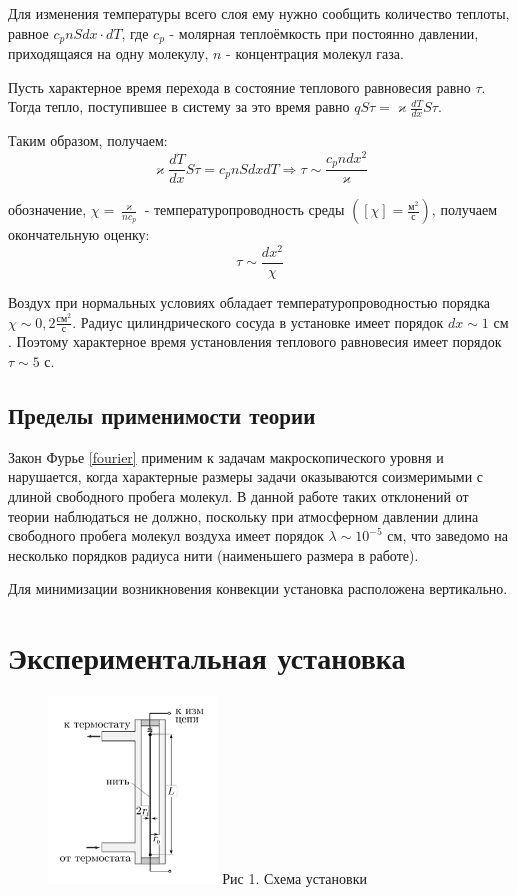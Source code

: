 \documentclass[15pt,a5paper,reqno]{article}
\renewcommand{\kappa}{\varkappa}
\begin{document}
    Для изменения температуры всего слоя ему нужно сообщить количество теплоты, равное $c_p nSdx\cdot dT$, где $c_p$ - молярная теплоёмкость при постоянно давлении, приходящаяся на одну молекулу, $n$ - концентрация молекул газа.
    
    Пусть характерное время перехода в состояние теплового равновесия равно $\tau$. Тогда тепло, поступившее в систему за это время равно $qS\tau = \kappa\frac{dT}{dx}S\tau$.
    
    Таким образом, получаем:
    \[\kappa\frac{dT}{dx}S\tau = c_pnSdxdT \Rightarrow \tau \sim \frac{c_p n dx^2}{\kappa}\]
    
     обозначение, $\chi = \frac{\kappa}{nc_p}$ - температуропроводность среды $\left([\chi] = \frac{\text{м}^2}{\text{с}}\right)$, получаем окончательную оценку:
    \[\tau\sim\frac{dx^2}{\chi}\]
    
    Воздух при нормальных условиях обладает температуропроводностью порядка $\chi\sim 0,2 \frac{\text{см}^2}{\text{с}}$. Радиус цилиндрического сосуда в установке имеет порядок $dx\sim 1\text{ см}$. Поэтому характерное время установления теплового равновесия имеет порядок $\tau\sim 5\text{ с}$.
    
    \subsection{Пределы применимости теории}
    
    Закон Фурье \eqref{fourier} применим к задачам макроскопического уровня и нарушается, когда характерные размеры задачи оказываются соизмеримыми с длиной свободного пробега молекул. В данной работе таких отклонений от теории наблюдаться не должно, поскольку при атмосферном давлении длина свободного пробега молекул воздуха имеет порядок $\lambda\sim 10^{-5}\text{ см}$, что заведомо на несколько порядков радиуса нити (наименьшего размера в работе).
    
    Для минимизации возникновения конвекции установка расположена вертикально.
    
\section{Экспериментальная установка}

	\begin{figure}
        \includegraphics[width=0.4\textwidth]{Рисунок 1. Схема установки.png}
        Рис 1. Схема установки
    \end{figure}
\end{document}
